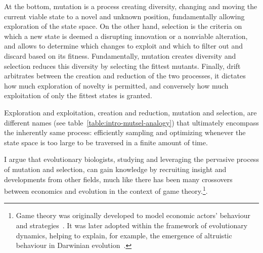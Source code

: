 At the bottom, mutation is a process creating diversity, changing and moving the current viable state to a novel and unknown position, fundamentally allowing exploration of the state space.
On the other hand, selection is the criteria on which a new state is deemed a disrupting innovation or a nonviable alteration, and allows to determine which changes to exploit and which to filter out and discard based on its fitness.
Fundamentally, mutation creates diversity and selection reduces this diversity by selecting the fittest mutants.
Finally, drift arbitrates between the creation and reduction of the two processes, it dictates how much exploration of novelty is permitted, and conversely how much exploitation of only the fittest states is granted.

Exploration and exploitation, creation and reduction, mutation and selection, are different names (see table~\ref{table:intro-mutsel-analogy}) that ultimately encompass the inherently same process: efficiently sampling and optimizing whenever the state space is too large to be traversed in a finite amount of time.

\begin{table}[H]
    \centering
    \noindent{}
    \caption[Mutation, selection and drift analogy]{
    Mutation, selection and drift lexicographic rephrasing in different fields.
    }
    \label{table:intro-mutsel-analogy}
\end{table}

I argue that evolutionary biologists, studying and leveraging the pervasive process of mutation and selection, can gain knowledge by recruiting insight and developments from other fields, much like there has been many crossovers between economics and evolution in the context of game theory.\footnote{Game theory was originally developed to model economic actors' behaviour and strategies~\citep{VonNeumann1947}. It was later adopted within the framework of evolutionary dynamics, helping to explain, for example, the emergence of altruistic behaviour in Darwinian evolution~\citep{Smith1973, Smith1982, Nowak2006}.}.

